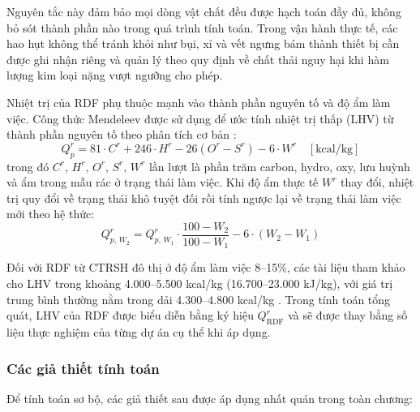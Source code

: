 \documentclass[../main.tex]{subfiles}
\begin{document}
Nguyên tắc này đảm bảo mọi dòng vật chất đều được hạch toán đầy đủ, không bỏ sót thành phần nào trong quá trình tính toán. Trong vận hành thực tế, các hao hụt không thể tránh khỏi như bụi, xỉ và vết ngưng bám thành thiết bị cần được ghi nhận riêng và quản lý theo quy định về chất thải nguy hại khi hàm lượng kim loại nặng vượt ngưỡng cho phép.

Nhiệt trị của RDF phụ thuộc mạnh vào thành phần nguyên tố và độ ẩm làm việc. Công thức Mendeleev được sử dụng để ước tính nhiệt trị thấp (LHV) từ thành phần nguyên tố theo phân tích cơ bản \cite{quyen2025giaotrinh}:
\begin{equation}
  Q^r_p = 81 \cdot C^r + 246 \cdot H^r - 26(O^r - S^r) - 6 \cdot W^r \quad [\text{kcal/kg}]
  \label{eq:mendeleev}
\end{equation}
trong đó $C^r,\, H^r,\, O^r,\, S^r,\, W^r$ lần lượt là phần trăm carbon, hydro, oxy, lưu huỳnh và ẩm trong mẫu rác ở trạng thái làm việc. Khi độ ẩm thực tế $W^r$ thay đổi, nhiệt trị quy đổi về trạng thái khô tuyệt đối rồi tính ngược lại về trạng thái làm việc mới theo hệ thức:
\begin{equation}
  Q^r_{p,\,W_2} = Q^r_{p,\,W_1} \cdot \frac{100 - W_2}{100 - W_1} - 6 \cdot (W_2 - W_1)
\end{equation}

Đối với RDF từ CTRSH đô thị ở độ ẩm làm việc 8--15\%, các tài liệu tham khảo cho LHV trong khoảng 4.000--5.500 kcal/kg (16.700--23.000 kJ/kg), với giá trị trung bình thường nằm trong dải 4.300--4.800 kcal/kg \cite{Arena2012,Sharuddin2016}. Trong tính toán tổng quát, LHV của RDF được biểu diễn bằng ký hiệu $Q_{\text{RDF}}^r$ và sẽ được thay bằng số liệu thực nghiệm của từng dự án cụ thể khi áp dụng.

\subsubsection{Các giả thiết tính toán}

Để tính toán sơ bộ, các giả thiết sau được áp dụng nhất quán trong toàn chương:
\end{document}
